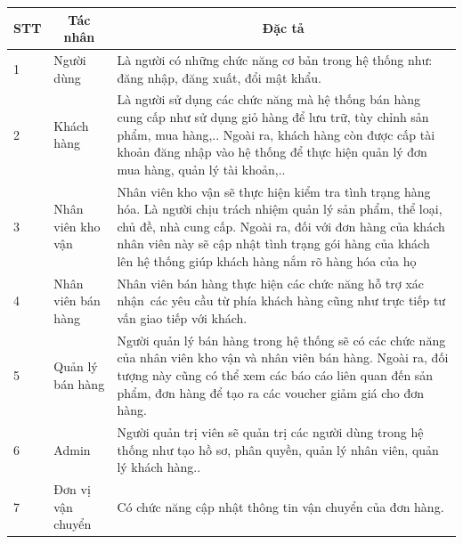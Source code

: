 \documentclass[12pt,a4paper,2sides]{report}
\begin{document}
\begin{tabular}{|l|l|p{9cm}|} 
\hline
\multicolumn{1}{|c|}{\textbf{STT}} & \multicolumn{1}{c|}{\textbf{Tác nhân}} & \multicolumn{1}{c|}{\textbf{Đặc tả}}                                                                                                                                                                                                                                               \\ 
\hline
1   & Người dùng  & Là người có những chức năng cơ bản trong hệ thống như: đăng nhập, đăng xuất, đổi mật khẩu.                                                                                                                                           \\ 
\hline
2   & Khách hàng & Là người sử dụng các chức năng mà hệ thống bán hàng cung cấp như sử dụng giỏ hàng để lưu trữ, tùy chỉnh sản phẩm, mua hàng,.. Ngoài ra, khách hàng còn được cấp tài khoản đăng nhập vào hệ thống để thực hiện quản lý đơn mua hàng, quản lý tài khoản,..                                                                                                    \\ 

\hline
3   & Nhân viên kho vận  & Nhân viên kho vận sẽ thực hiện kiểm tra tình trạng hàng hóa. Là người chịu trách nhiệm quản lý sản phẩm, thể loại, chủ đề, nhà cung cấp. Ngoài ra, đối với đơn hàng của khách nhân viên này sẽ cập nhật tình trạng gói hàng của khách lên hệ thống giúp khách hàng nắm rõ hàng hóa của họ                                                                                                                                          \\ 

\hline
4   & Nhân viên bán hàng & Nhân viên bán hàng thực hiện các chức năng hỗ trợ xác nhận~các yêu cầu từ phía khách hàng cũng như trực tiếp tư vấn giao tiếp với khách.                                                                                                                                           \\ 
\hline
5   & Quản lý bán hàng  & Người quản lý bán hàng trong hệ thống sẽ có các chức năng của nhân viên kho vận và nhân viên bán hàng. Ngoài ra, đối tượng này cũng có thể xem các báo cáo liên quan đến sản phẩm, đơn hàng để tạo ra các voucher giảm giá cho đơn hàng.                                                                                                                                           \\ 
\hline
6   & Admin  & Người quản trị viên sẽ quản trị các người dùng trong hệ thống như tạo hồ sơ, phân quyền, quản lý nhân viên, quản lý khách hàng..                                                                                                                                           \\ 

\hline
7   & Đơn vị vận chuyển & Có chức năng cập nhật thông tin vận chuyển của đơn hàng.                                                                                                                                         \\ 
\hline
\end{tabular}
\end{document}
